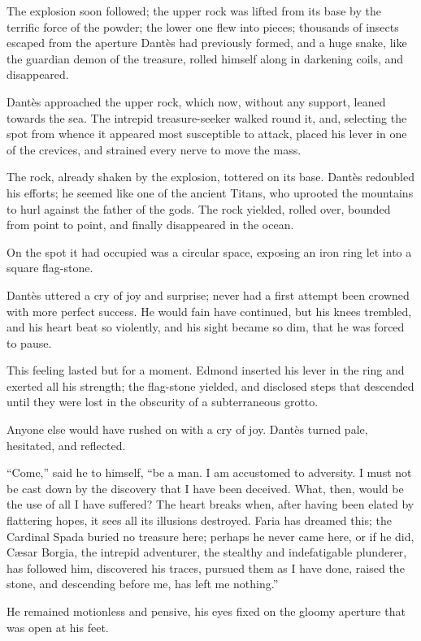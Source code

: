The explosion soon followed; the upper rock was lifted from its base by
the terrific force of the powder; the lower one flew into pieces;
thousands of insects escaped from the aperture Dantès had previously
formed, and a huge snake, like the guardian demon of the treasure,
rolled himself along in darkening coils, and disappeared.

Dantès approached the upper rock, which now, without any support,
leaned towards the sea. The intrepid treasure-seeker walked round it,
and, selecting the spot from whence it appeared most susceptible to
attack, placed his lever in one of the crevices, and strained every
nerve to move the mass.

The rock, already shaken by the explosion, tottered on its base. Dantès
redoubled his efforts; he seemed like one of the ancient Titans, who
uprooted the mountains to hurl against the father of the gods. The rock
yielded, rolled over, bounded from point to point, and finally
disappeared in the ocean.

On the spot it had occupied was a circular space, exposing an iron ring
let into a square flag-stone.

Dantès uttered a cry of joy and surprise; never had a first attempt
been crowned with more perfect success. He would fain have continued,
but his knees trembled, and his heart beat so violently, and his sight
became so dim, that he was forced to pause.

This feeling lasted but for a moment. Edmond inserted his lever in the
ring and exerted all his strength; the flag-stone yielded, and
disclosed steps that descended until they were lost in the obscurity of
a subterraneous grotto.

Anyone else would have rushed on with a cry of joy. Dantès turned pale,
hesitated, and reflected.

“Come,” said he to himself, “be a man. I am accustomed to adversity. I
must not be cast down by the discovery that I have been deceived. What,
then, would be the use of all I have suffered? The heart breaks when,
after having been elated by flattering hopes, it sees all its illusions
destroyed. Faria has dreamed this; the Cardinal Spada buried no
treasure here; perhaps he never came here, or if he did, Cæsar Borgia,
the intrepid adventurer, the stealthy and indefatigable plunderer, has
followed him, discovered his traces, pursued them as I have done,
raised the stone, and descending before me, has left me nothing.”

He remained motionless and pensive, his eyes fixed on the gloomy
aperture that was open at his feet.


